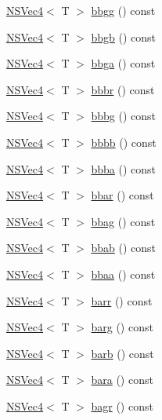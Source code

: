 \begin{DoxyCompactItemize}
\item 
\hyperlink{structNSVec4}{N\-S\-Vec4}$<$ T $>$ \hyperlink{structNSVec4_a629d916dcb37840c8de40368f5de33d4}{bbgg} () const 
\item 
\hyperlink{structNSVec4}{N\-S\-Vec4}$<$ T $>$ \hyperlink{structNSVec4_a1591f0566e2f31545a15ed74276a20ac}{bbgb} () const 
\item 
\hyperlink{structNSVec4}{N\-S\-Vec4}$<$ T $>$ \hyperlink{structNSVec4_ad2c44f6493c894579e86bcbfc6969f9b}{bbga} () const 
\item 
\hyperlink{structNSVec4}{N\-S\-Vec4}$<$ T $>$ \hyperlink{structNSVec4_a180b4b61ba383f8bfa9f8c67f94c8c5b}{bbbr} () const 
\item 
\hyperlink{structNSVec4}{N\-S\-Vec4}$<$ T $>$ \hyperlink{structNSVec4_a8270b4caccd505726078c69bac5e0f57}{bbbg} () const 
\item 
\hyperlink{structNSVec4}{N\-S\-Vec4}$<$ T $>$ \hyperlink{structNSVec4_aa25ef387452d3ef00ae8f8acc3d1374f}{bbbb} () const 
\item 
\hyperlink{structNSVec4}{N\-S\-Vec4}$<$ T $>$ \hyperlink{structNSVec4_a4e8a2e7a4f5430363e7c17c5f2637bf5}{bbba} () const 
\item 
\hyperlink{structNSVec4}{N\-S\-Vec4}$<$ T $>$ \hyperlink{structNSVec4_a92f3560a672221151b0624dade8b22e9}{bbar} () const 
\item 
\hyperlink{structNSVec4}{N\-S\-Vec4}$<$ T $>$ \hyperlink{structNSVec4_a814b5ebd1c7fb8094fbe40485f687b01}{bbag} () const 
\item 
\hyperlink{structNSVec4}{N\-S\-Vec4}$<$ T $>$ \hyperlink{structNSVec4_a976a510f77bfb5263bbdc243597cd5b6}{bbab} () const 
\item 
\hyperlink{structNSVec4}{N\-S\-Vec4}$<$ T $>$ \hyperlink{structNSVec4_a0ef0b8dd65c9eeb3ae9c01c33dbaf4ba}{bbaa} () const 
\item 
\hyperlink{structNSVec4}{N\-S\-Vec4}$<$ T $>$ \hyperlink{structNSVec4_aee77fe872b8cc37051043f0acb205e33}{barr} () const 
\item 
\hyperlink{structNSVec4}{N\-S\-Vec4}$<$ T $>$ \hyperlink{structNSVec4_a533d99abe63607d85a42a53429dc526f}{barg} () const 
\item 
\hyperlink{structNSVec4}{N\-S\-Vec4}$<$ T $>$ \hyperlink{structNSVec4_a44512c9f6356263569942fc72be78aa5}{barb} () const 
\item 
\hyperlink{structNSVec4}{N\-S\-Vec4}$<$ T $>$ \hyperlink{structNSVec4_ab552dd5ef9301fdb7dbd8c0b992791b6}{bara} () const 
\item 
\hyperlink{structNSVec4}{N\-S\-Vec4}$<$ T $>$ \hyperlink{structNSVec4_a2db4418c9d0239b823367e760f00fe90}{bagr} () const 

\end{DoxyCompactItemize}
